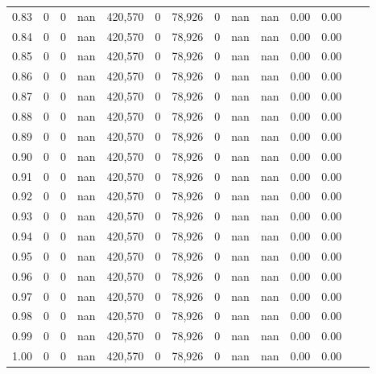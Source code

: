 \begin{tabular}{rrrrrrrrrrrrrr}
0.83 &       0 &      0 &     nan &  420,570 &        0 &  78,926 &       0 &   nan &   nan &  0.00 &      0.00 \\
0.84 &       0 &      0 &     nan &  420,570 &        0 &  78,926 &       0 &   nan &   nan &  0.00 &      0.00 \\
0.85 &       0 &      0 &     nan &  420,570 &        0 &  78,926 &       0 &   nan &   nan &  0.00 &      0.00 \\
0.86 &       0 &      0 &     nan &  420,570 &        0 &  78,926 &       0 &   nan &   nan &  0.00 &      0.00 \\
0.87 &       0 &      0 &     nan &  420,570 &        0 &  78,926 &       0 &   nan &   nan &  0.00 &      0.00 \\
0.88 &       0 &      0 &     nan &  420,570 &        0 &  78,926 &       0 &   nan &   nan &  0.00 &      0.00 \\
0.89 &       0 &      0 &     nan &  420,570 &        0 &  78,926 &       0 &   nan &   nan &  0.00 &      0.00 \\
0.90 &       0 &      0 &     nan &  420,570 &        0 &  78,926 &       0 &   nan &   nan &  0.00 &      0.00 \\
0.91 &       0 &      0 &     nan &  420,570 &        0 &  78,926 &       0 &   nan &   nan &  0.00 &      0.00 \\
0.92 &       0 &      0 &     nan &  420,570 &        0 &  78,926 &       0 &   nan &   nan &  0.00 &      0.00 \\
0.93 &       0 &      0 &     nan &  420,570 &        0 &  78,926 &       0 &   nan &   nan &  0.00 &      0.00 \\
0.94 &       0 &      0 &     nan &  420,570 &        0 &  78,926 &       0 &   nan &   nan &  0.00 &      0.00 \\
0.95 &       0 &      0 &     nan &  420,570 &        0 &  78,926 &       0 &   nan &   nan &  0.00 &      0.00 \\
0.96 &       0 &      0 &     nan &  420,570 &        0 &  78,926 &       0 &   nan &   nan &  0.00 &      0.00 \\
0.97 &       0 &      0 &     nan &  420,570 &        0 &  78,926 &       0 &   nan &   nan &  0.00 &      0.00 \\
0.98 &       0 &      0 &     nan &  420,570 &        0 &  78,926 &       0 &   nan &   nan &  0.00 &      0.00 \\
0.99 &       0 &      0 &     nan &  420,570 &        0 &  78,926 &       0 &   nan &   nan &  0.00 &      0.00 \\
1.00 &       0 &      0 &     nan &  420,570 &        0 &  78,926 &       0 &   nan &   nan &  0.00 &      0.00 \\
\bottomrule
\end{tabular}
